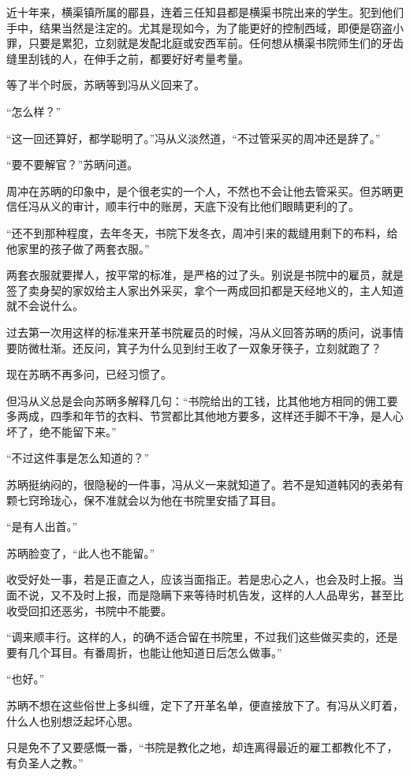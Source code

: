 近十年来，横渠镇所属的郿县，连着三任知县都是横渠书院出来的学生。犯到他们手中，结果当然是注定的。尤其是现如今，为了能更好的控制西域，即便是窃盗小罪，只要是累犯，立刻就是发配北庭或安西军前。任何想从横渠书院师生们的牙齿缝里刮钱的人，在伸手之前，都要好好考量考量。

等了半个时辰，苏昞等到冯从义回来了。

“怎么样？”

“这一回还算好，都学聪明了。”冯从义淡然道，“不过管采买的周冲还是辞了。”

“要不要解官？”苏昞问道。

周冲在苏昞的印象中，是个很老实的一个人，不然也不会让他去管采买。但苏昞更信任冯从义的审计，顺丰行中的账房，天底下没有比他们眼睛更利的了。

“还不到那种程度，去年冬天，书院下发冬衣，周冲引来的裁缝用剩下的布料，给他家里的孩子做了两套衣服。”

两套衣服就要撵人，按平常的标准，是严格的过了头。别说是书院中的雇员，就是签了卖身契的家奴给主人家出外采买，拿个一两成回扣都是天经地义的，主人知道就不会说什么。

过去第一次用这样的标准来开革书院雇员的时候，冯从义回答苏昞的质问，说事情要防微杜渐。还反问，箕子为什么见到纣王收了一双象牙筷子，立刻就跑了？

现在苏昞不再多问，已经习惯了。

但冯从义总是会向苏昞多解释几句：“书院给出的工钱，比其他地方相同的佣工要多两成，四季和年节的衣料、节赏都比其他地方要多，这样还手脚不干净，是人心坏了，绝不能留下来。”

“不过这件事是怎么知道的？”

苏昞挺纳闷的，很隐秘的一件事，冯从义一来就知道了。若不是知道韩冈的表弟有颗七窍玲珑心，保不准就会以为他在书院里安插了耳目。

“是有人出首。”

苏昞脸变了，“此人也不能留。”

收受好处一事，若是正直之人，应该当面指正。若是忠心之人，也会及时上报。当面不说，又不及时上报，而是隐瞒下来等待时机告发，这样的人人品卑劣，甚至比收受回扣还恶劣，书院中不能要。

“调来顺丰行。这样的人，的确不适合留在书院里，不过我们这些做买卖的，还是要有几个耳目。有番周折，也能让他知道日后怎么做事。”

“也好。”

苏昞不想在这些俗世上多纠缠，定下了开革名单，便直接放下了。有冯从义盯着，什么人也别想泛起坏心思。

只是免不了又要感慨一番，“书院是教化之地，却连离得最近的雇工都教化不了，有负圣人之教。”


